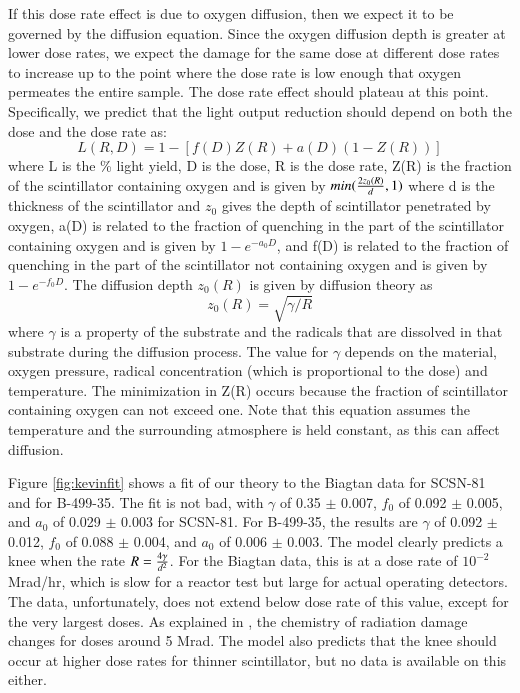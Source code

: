 If this dose rate effect is due to oxygen diffusion, then
we expect it to be governed by the diffusion equation.  Since
the oxygen diffusion depth is greater at lower dose rates,
we expect the damage for the same dose at different dose rates to
increase up to the point where the dose rate is low enough that oxygen
permeates the entire sample.  The dose rate effect should plateau
at this point.  Specifically, we predict that the light output
reduction should depend on both the dose and the dose rate as:
$$ L(R,D) = 1 - [f(D)Z(R) + a(D)(1-Z(R))]$$
where L is the \% light yield, D is the dose, R is the dose rate, 
Z(R) is the fraction of the scintillator containing 
oxygen and is given by $min({{2 z_0(R)}\over{d}},1)$
where d is the thickness of the scintillator and $z_0$ gives
the depth of scintillator penetrated by oxygen,
a(D) is related to the fraction of quenching in the part of
the scintillator containing oxygen and is given by $1-e^{-a_0 D}$, 
and
f(D) is related to the fraction of quenching in the part of
the scintillator not containing oxygen and is given by $1-e^{-f_0 D}$.
The diffusion depth $z_0(R)$ is given by diffusion theory as 
$$z_0(R)=\sqrt{\gamma/R}$$
where $\gamma$ is a property of the substrate and the radicals that
are dissolved in that substrate during the diffusion process.
The value for $\gamma$ depends on the material, oxygen pressure,
radical concentration (which is proportional to the dose) and 
temperature.
The minimization in Z(R) occurs because the fraction of scintillator
containing oxygen can not exceed one.  Note that this equation 
assumes the temperature and the surrounding atmosphere
is held constant, as this can 
affect diffusion.

Figure \ref{fig:kevinfit} shows a fit of our theory to the Biagtan data 
\cite{Biagtan1996125} for SCSN-81 and for B-499-35.  The fit is not bad,
with 
$\gamma$ of 0.35 $\pm$ 0.007, $f_0$ of 0.092 $\pm$ 0.005,
and $a_0$ of 0.029 $\pm$ 0.003 
for SCSN-81.  For B-499-35, the results
are 
$\gamma$ of 0.092 $\pm$ 0.012, $f_0$ of 0.088 $\pm$ 0.004,
and $a_0$ of 0.006 $\pm$ 0.003. 
The model clearly predicts a knee when the rate $R={{4 \gamma}\over{d^2}}$.
For the Biagtan data, this is at a dose rate of $10^{-2}$ Mrad/hr, which is
slow for a reactor test but large for actual operating detectors.
The data, unfortunately, does not extend below dose rate of this value,
except for the very largest doses.  As explained in \cite{harrah},
the chemistry of radiation damage changes for doses
around 5 Mrad.
The model also predicts that the knee should occur at higher
dose rates for thinner scintillator, but no data is available
on this either.


